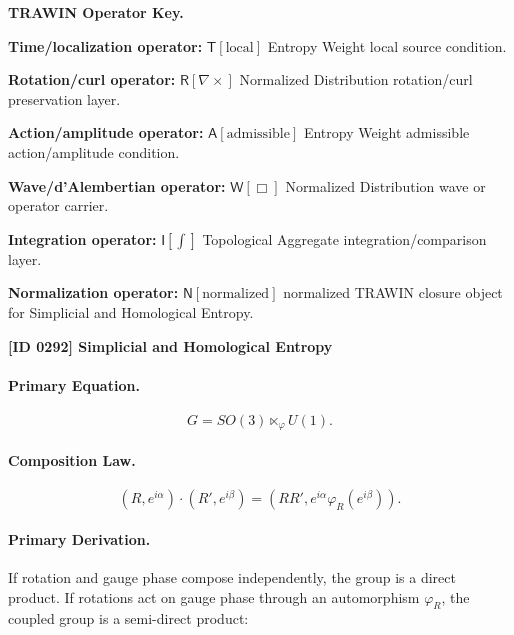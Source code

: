 \par\vspace{0.45\baselineskip}
\noindent\begin{minipage}[t]{\linewidth}
\begingroup
\small
\raggedright
\textbf{TRAWIN Operator Key.}\par
\noindent\textbf{Time/localization operator:} $\mathsf{T}\!\left[\mathrm{local}\right]$ Entropy Weight local source condition.\par
\noindent\textbf{Rotation/curl operator:} $\mathsf{R}\!\left[\nabla\times\right]$ Normalized Distribution rotation/curl preservation layer.\par
\noindent\textbf{Action/amplitude operator:} $\mathsf{A}\!\left[\mathrm{admissible}\right]$ Entropy Weight admissible action/amplitude condition.\par
\noindent\textbf{Wave/d'Alembertian operator:} $\mathsf{W}\!\left[\Box\right]$ Normalized Distribution wave or operator carrier.\par
\noindent\textbf{Integration operator:} $\mathsf{I}\!\left[\int\right]$ Topological Aggregate integration/comparison layer.\par
\noindent\textbf{Normalization operator:} $\mathsf{N}\!\left[\mathrm{normalized}\right]$ normalized TRAWIN closure object for Simplicial and Homological Entropy.\par
\endgroup
\end{minipage}

\clearpage
\noindent\textbf{[ID 0292] Simplicial and Homological Entropy}\par
\vspace{0.35em}
\paragraph{Primary Equation.}
\begin{equation}
G=SO(3)\ltimes_{\varphi} U(1).
\end{equation}

\paragraph{Composition Law.}
\begin{equation}
(R,e^{i\alpha})\cdot(R',e^{i\beta})
=
\left(
RR',
e^{i\alpha}\varphi_R(e^{i\beta})
\right).
\end{equation}

\paragraph{Primary Derivation.}
If rotation and gauge phase compose independently, the group is a direct product.  
If rotations act on gauge phase through an automorphism $\varphi_R$, the coupled group is a semi-direct product:

